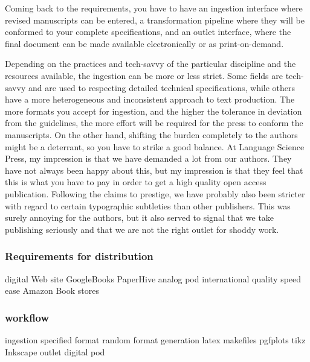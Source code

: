 \documentclass[output=guidelines,guidelines] {langscibook}
\begin{document}
Coming back to the requirements, you have to have an ingestion interface where revised manuscripts can be entered, a transformation pipeline where they will be conformed to your complete specifications, and an outlet interface, where the final document can be made available electronically or as print-on-demand.

Depending on the practices and tech-savvy of the particular discipline and the resources available, the ingestion can be more or less strict. Some fields are tech-savvy and are used to respecting detailed technical specifications, while others have a more heterogeneous and inconsistent approach to text production. The more formats you accept for ingestion, and the higher the tolerance in deviation from the guidelines, the more effort will be required for the press to conform the manuscripts. On the other hand, shifting the burden completely to the authors might be a deterrant, so you have to strike a good balance. At Language Science Press, my impression is that we have demanded a lot from our authors. They have not always been happy about this, but my impression is that they feel that this is what you have to pay in order to get a high quality open access publication. Following the claims to prestige, we have probably also been stricter with regard to certain typographic subtleties than other publishers. This was surely annoying for the authors, but it also served to signal that we take publishing seriously and that we are not the right outlet for shoddy work. 


\subsubsection{Requirements for distribution}
                    digital
                        Web site
                        GoogleBooks
                        PaperHive
                    analog
                        pod
                            international
                            quality
                            speed
                            ease
                        Amazon
                        Book stores


\subsubsection{workflow}
                    ingestion 
                        specified format
                        random format
                    generation
                        latex
                        makefiles
                        pgfplots
                        tikz
                        Inkscape
                    outlet
                        digital
                        pod
\end{document}
